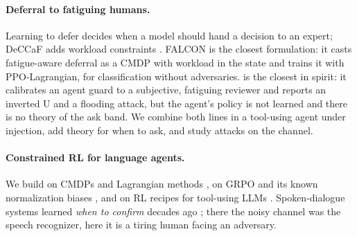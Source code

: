 \documentclass[10pt]{article}
\theoremstyle{plain}
\theoremstyle{definition}
\begin{document}
\paragraph{Deferral to fatiguing humans.} Learning to defer \citep{madras2018predict,mozannar2020consistent} decides when a model should hand a decision to an expert; DeCCaF adds workload constraints \citep{alves2024deccaf}. FALCON \citep{zhang2026falcon} is the closest formulation: it casts fatigue-aware deferral as a CMDP with workload in the state and trains it with PPO-Lagrangian, for classification without adversaries. \citet{turan2026oversight} is the closest in spirit: it calibrates an agent guard to a subjective, fatiguing reviewer and reports an inverted U and a flooding attack, but the agent's policy is not learned and there is no theory of the ask band. We combine both lines in a tool-using agent under injection, add theory for when to ask, and study attacks on the channel.

\paragraph{Constrained RL for language agents.} We build on CMDPs \citep{altman1999constrained} and Lagrangian methods \citep{tessler2019rcpo,stooke2020pid}, on GRPO \citep{shao2024deepseekmath} and its known normalization biases \citep{liu2025drgrpo}, and on RL recipes for tool-using LLMs \citep{jin2025searchr1,hilton2025art}. Spoken-dialogue systems learned \emph{when to confirm} decades ago \citep{singh2002njfun,young2013pomdp}; there the noisy channel was the speech recognizer, here it is a tiring human facing an adversary.
\end{document}
